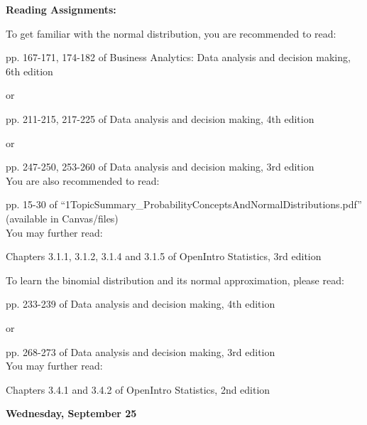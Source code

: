 \documentclass[11pt]{article}
\begin{document}
\noindent\textbf{Reading Assignments:}

To get familiar with the normal distribution, you are recommended to read:

pp. 167-171, 174-182 of Business Analytics: Data analysis and decision making, 6th edition

or

pp. 211-215, 217-225 of Data analysis and decision making, 4th edition

or 

pp. 247-250, 253-260 of  Data analysis and decision making, 3rd edition\\

You are also recommended to read:

pp. 15-30 of ``1TopicSummary\_ProbabilityConceptsAndNormalDistributions.pdf'' (available in Canvas/files) \\


You may further read:

Chapters 3.1.1, 3.1.2, 3.1.4 and 3.1.5 of OpenIntro Statistics, 3rd edition %

To learn the binomial distribution and its  normal approximation, please read:

pp. 233-239 of Data analysis and decision making, 4th edition

or 

pp. 268-273 of  Data analysis and decision making, 3rd edition\\

You may further read:

Chapters 3.4.1 and 3.4.2 of OpenIntro Statistics, 2nd edition




\noindent\textbf{\large Wednesday, September 25} 	
\end{document}
